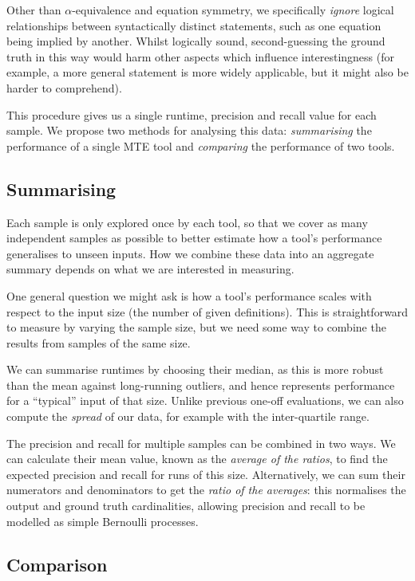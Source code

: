 Other than $\alpha$-equivalence and equation symmetry, we specifically
\emph{ignore} logical relationships between syntactically distinct statements,
such as one equation being implied by another. Whilst logically sound,
second-guessing the ground truth in this way would harm other aspects which
influence interestingness (for example, a more general statement is more widely
applicable, but it might also be harder to comprehend).

This procedure gives us a single runtime, precision and recall value for each
sample. We propose two methods for analysing this data: \emph{summarising}
the performance of a single MTE tool and \emph{comparing} the performance of two
tools.

\subsection{Summarising}

Each sample is only explored once by each tool, so that we cover as many
independent samples as possible to better estimate how a tool's performance
generalises to unseen inputs. How we combine these data into an aggregate
summary depends on what we are interested in measuring.

One general question we might ask is how a tool's performance scales with
respect to the input size (the number of given definitions). This is
straightforward to measure by varying the sample size, but we need some way to
combine the results from samples of the same size.

We can summarise runtimes by choosing their median, as this is more robust than
the mean against long-running outliers, and hence represents performance for a
``typical'' input of that size. Unlike previous one-off evaluations, we can also
compute the \emph{spread} of our data, for example with the inter-quartile
range.

The precision and recall for multiple samples can be combined in two ways. We
can calculate their mean value, known as the \emph{average of the ratios}, to
find the expected precision and recall for runs of this size. Alternatively, we
can sum their numerators and denominators to get the \emph{ratio of the
  averages}: this normalises the output and ground truth cardinalities, allowing
precision and recall to be modelled as simple Bernoulli processes.

\subsection{Comparison}


